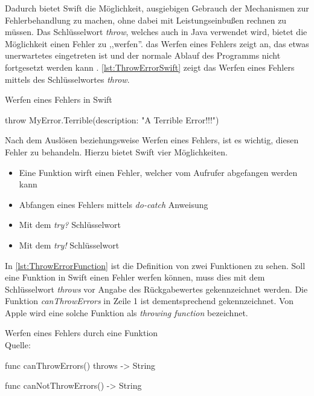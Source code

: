 Dadurch bietet Swift die Möglichkeit, ausgiebigen Gebrauch der Mechanismen zur Fehlerbehandlung zu machen, ohne dabei mit Leistungseinbußen rechnen zu müssen.
Das Schlüsselwort \textit{throw}, welches auch in Java verwendet wird, bietet die Möglichkeit einen Fehler zu ,,werfen''.
das Werfen eines Fehlers zeigt an, das etwas unerwartetes eingetreten ist und der normale Ablauf des Programms nicht fortgesetzt werden kann \cite[S.311]{Apple.2017}.
\autoref{lst:ThrowErrorSwift} zeigt das Werfen eines Fehlers mittels des Schlüsselwortes \textit{throw}.

\begin{listing}[H]
\caption{Werfen eines Fehlers in Swift}
\label{lst:ThrowErrorSwift}
\begin{SwiftCode}
throw MyError.Terrible(description: "A Terrible Error!!!")
\end{SwiftCode}
\end{listing}

Nach dem Auslösen beziehungsweise Werfen eines Fehlers, ist es wichtig, diesen Fehler zu behandeln. 
Hierzu bietet Swift vier Möglichkeiten.

\begin{itemize}
    \item Eine Funktion wirft einen Fehler, welcher vom Aufrufer abgefangen werden kann
    \item Abfangen eines Fehlers mittels \textit{do-catch} Anweisung
    \item Mit dem \textit{try?} Schlüsselwort
    \item Mit dem \textit{try!} Schlüsselwort
\end{itemize}

In \autoref{lst:ThrowErrorFunction} ist die Definition von zwei Funktionen zu sehen. 
Soll eine Funktion in Swift einen Fehler werfen können, muss dies mit dem Schlüsselwort \textit{throws} vor Angabe des Rückgabewertes gekennzeichnet werden.
Die Funktion \textit{canThrowErrors} in Zeile 1 ist dementsprechend gekennzeichnet.
Von Apple wird eine solche Funktion als \textit{throwing function} bezeichnet. 

\begin{listing}[H]
\caption{Werfen eines Fehlers durch eine Funktion \\ Quelle:\cite[S311]{Apple.2017}}
\label{lst:ThrowErrorFunction}
\begin{SwiftCode}
func canThrowErrors() throws -> String

func canNotThrowErrors() -> String
\end{SwiftCode}
\end{listing}

